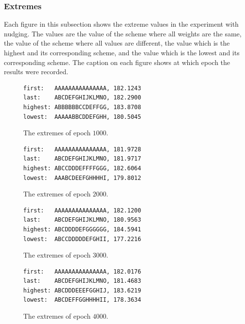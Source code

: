 \documentclass[a4paper, 10pt, notitlepage, twocolumn]{article}
\begin{document}
\subsubsection{Extremes}
\FloatBarrier

Each figure in this subsection shows the extreme values in the experiment with nudging. The values are the value of the scheme where all weights are the same, the value of the scheme where all values are different, the value which is the highest and its corresponding scheme, and the value which is the lowest and its corresponding scheme. The caption on each figure shows at which epoch the results were recorded.

\FloatBarrier

\begin{figure}[!ht]
 \begin{verbatim}
first:   AAAAAAAAAAAAAAA, 182.1243
last:    ABCDEFGHIJKLMNO, 182.2900
highest: ABBBBBBCCDEFFGG, 183.8708
lowest:  AAAAABBCDDEFGHH, 180.5045
 \end{verbatim}
 \vspace{-20pt} 
 \caption{The extremes of epoch $1000$.}
\end{figure}


\begin{figure}[!ht]
 \begin{verbatim}
first:   AAAAAAAAAAAAAAA, 181.9728
last:    ABCDEFGHIJKLMNO, 181.9717
highest: ABCCDDDEFFFFGGG, 182.6064
lowest:  AAABCDEEFGHHHHI, 179.8012
 \end{verbatim}
 \vspace{-20pt} 
 \caption{The extremes of epoch $2000$.}
\end{figure}


\begin{figure}[!ht]
 \begin{verbatim}
first:   AAAAAAAAAAAAAAA, 182.1200
last:    ABCDEFGHIJKLMNO, 180.9563
highest: ABCDDDDEFGGGGGG, 184.5941
lowest:  ABCCDDDDDEFGHII, 177.2216
 \end{verbatim}
 \vspace{-20pt} 
 \caption{The extremes of epoch $3000$.}
\end{figure}


\begin{figure}[!ht]
 \begin{verbatim}
first:   AAAAAAAAAAAAAAA, 182.0176
last:    ABCDEFGHIJKLMNO, 181.4683
highest: ABCDDDEEEFGGHIJ, 183.6219
lowest:  ABCDEFFGGHHHHII, 178.3634
 \end{verbatim}
 \vspace{-20pt} 
 \caption{The extremes of epoch $4000$.}
\end{figure}
\end{document}
